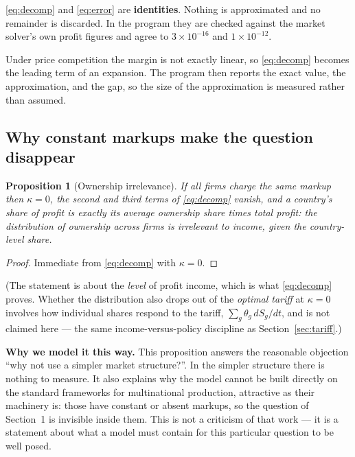 \documentclass[11pt]{article}
\newenvironment{keypoint}
  {\begin{lrbox}{\kbox}\begin{minipage}{0.93\textwidth}\vspace{3pt}}
  {\vspace{3pt}\end{minipage}\end{lrbox}\begin{center}\fbox{\usebox{\kbox}}\end{center}}
\newcommand{\why}[1]{\smallskip\noindent\textbf{Why we model it this way.} #1\smallskip}
\theoremstyle{plain}
\newtheorem{proposition}{Proposition}
\theoremstyle{remark}
\theoremstyle{definition}
\begin{document}
\begin{keypoint}
\eqref{eq:decomp} and \eqref{eq:error} are \textbf{identities}. Nothing is
approximated and no remainder is discarded. In the program they are checked against
the market solver's own profit figures and agree to $3\times10^{-16}$ and
$1\times10^{-12}$.

Under price competition the margin is not exactly linear, so \eqref{eq:decomp} becomes
the leading term of an expansion. The program then reports the exact value, the
approximation, and the gap, so the size of the approximation is measured rather than
assumed.
\end{keypoint}

\subsection{Why constant markups make the question disappear}

\begin{proposition}[Ownership irrelevance]\label{prop:irrelevance}
If all firms charge the same markup then $\kappa=0$, the second and third terms of
\eqref{eq:decomp} vanish, and a country's share of profit is exactly its average
ownership share times total profit: the distribution of ownership across firms is
irrelevant to \emph{income}, given the country-level share.
\end{proposition}

\begin{proof}
Immediate from \eqref{eq:decomp} with $\kappa=0$.
\end{proof}

\noindent(The statement is about the \emph{level} of profit income, which is what
\eqref{eq:decomp} proves. Whether the distribution also drops out of the \emph{optimal
tariff} at $\kappa=0$ involves how individual shares respond to the tariff,
$\sum_g\theta_g\,dS_g/dt$, and is not claimed here --- the same income-versus-policy
discipline as Section~\ref{sec:tariff}.)

\why{This proposition answers the reasonable objection ``why not use a simpler market
structure?''. In the simpler structure there is nothing to measure. It also explains
why the model cannot be built directly on the standard frameworks for multinational
production, attractive as their machinery is: those have constant or absent markups, so
the question of Section~1 is invisible inside them. This is not a criticism of that
work --- it is a statement about what a model must contain for this particular question
to be well posed.}
\end{document}
